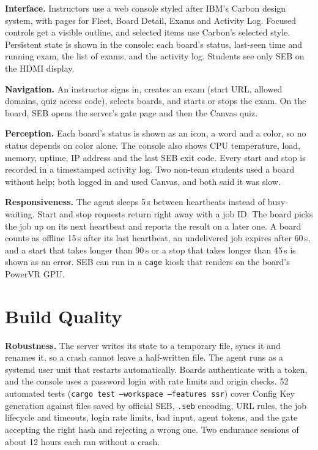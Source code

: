 \documentclass[11pt]{article}
\begin{document}
\textbf{Interface.} Instructors use a web console styled after IBM's Carbon design system, with pages for Fleet, Board Detail, Exams and Activity Log. Focused controls get a visible outline, and selected items use Carbon's selected style. Persistent state is shown in the console: each board's status, last-seen time and running exam, the list of exams, and the activity log. Students see only SEB on the HDMI display.

\textbf{Navigation.} An instructor signs in, creates an exam (start URL, allowed domains, quiz access code), selects boards, and starts or stops the exam. On the board, SEB opens the server's gate page and then the Canvas quiz.

\textbf{Perception.} Each board's status is shown as an icon, a word and a color, so no status depends on color alone. The console also shows CPU temperature, load, memory, uptime, IP address and the last SEB exit code. Every start and stop is recorded in a timestamped activity log. Two non-team students used a board without help; both logged in and used Canvas, and both said it was slow.

\textbf{Responsiveness.} The agent sleeps 5\,s between heartbeats instead of busy-waiting. Start and stop requests return right away with a job ID. The board picks the job up on its next heartbeat and reports the result on a later one. A board counts as offline 15\,s after its last heartbeat, an undelivered job expires after 60\,s, and a start that takes longer than 90\,s or a stop that takes longer than 45\,s is shown as an error. SEB can run in a \texttt{cage} kiosk that renders on the board's PowerVR GPU.

\section{Build Quality}

\textbf{Robustness.} The server writes its state to a temporary file, syncs it and renames it, so a crash cannot leave a half-written file. The agent runs as a systemd user unit that restarts automatically. Boards authenticate with a token, and the console uses a password login with rate limits and origin checks. 52 automated tests (\texttt{cargo test --workspace --features ssr}) cover Config Key generation against files saved by official SEB, \texttt{.seb} encoding, URL rules, the job lifecycle and timeouts, login rate limits, bad input, agent tokens, and the gate accepting the right hash and rejecting a wrong one. Two endurance sessions of about 12 hours each ran without a crash.
\end{document}
